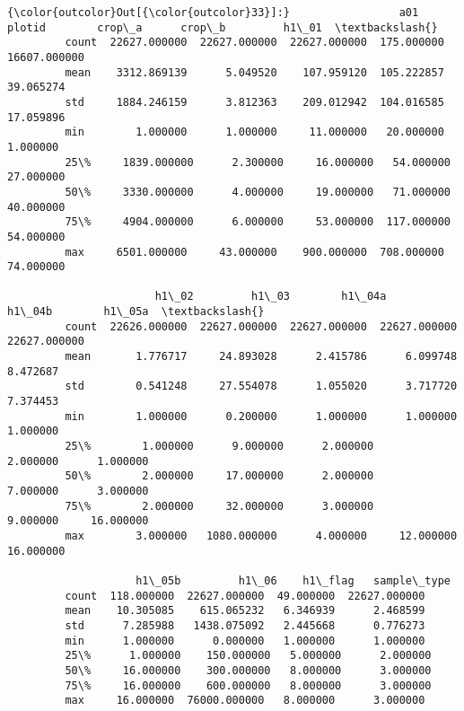 \documentclass[11pt]{article}
\begin{document}
\begin{Verbatim}[commandchars=\\\{\}]
{\color{outcolor}Out[{\color{outcolor}33}]:}                 a01        plotid        crop\_a      crop\_b         h1\_01  \textbackslash{}
         count  22627.000000  22627.000000  22627.000000  175.000000  16607.000000   
         mean    3312.869139      5.049520    107.959120  105.222857     39.065274   
         std     1884.246159      3.812363    209.012942  104.016585     17.059896   
         min        1.000000      1.000000     11.000000   20.000000      1.000000   
         25\%     1839.000000      2.300000     16.000000   54.000000     27.000000   
         50\%     3330.000000      4.000000     19.000000   71.000000     40.000000   
         75\%     4904.000000      6.000000     53.000000  117.000000     54.000000   
         max     6501.000000     43.000000    900.000000  708.000000     74.000000   
         
                       h1\_02         h1\_03        h1\_04a        h1\_04b        h1\_05a  \textbackslash{}
         count  22626.000000  22627.000000  22627.000000  22627.000000  22627.000000   
         mean       1.776717     24.893028      2.415786      6.099748      8.472687   
         std        0.541248     27.554078      1.055020      3.717720      7.374453   
         min        1.000000      0.200000      1.000000      1.000000      1.000000   
         25\%        1.000000      9.000000      2.000000      2.000000      1.000000   
         50\%        2.000000     17.000000      2.000000      7.000000      3.000000   
         75\%        2.000000     32.000000      3.000000      9.000000     16.000000   
         max        3.000000   1080.000000      4.000000     12.000000     16.000000   
         
                    h1\_05b         h1\_06    h1\_flag   sample\_type  
         count  118.000000  22627.000000  49.000000  22627.000000  
         mean    10.305085    615.065232   6.346939      2.468599  
         std      7.285988   1438.075092   2.445668      0.776273  
         min      1.000000      0.000000   1.000000      1.000000  
         25\%      1.000000    150.000000   5.000000      2.000000  
         50\%     16.000000    300.000000   8.000000      3.000000  
         75\%     16.000000    600.000000   8.000000      3.000000  
         max     16.000000  76000.000000   8.000000      3.000000  
\end{Verbatim}
            

    
    
    
    
\end{document}

